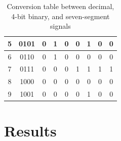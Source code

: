\documentclass[12pt]{article}
\begin{document}
\begin{table}[ht]
\begin{tabular}{ | c | c | c | c | c | c | c | c | c | }
  5                                                                      & 0101                                                                    & 0                             & 1                             & 0                             & 0                             & 1                             & 0                             & 0                             \\ \hline
  6                                                                      & 0110                                                                    & 0                             & 1                             & 0                             & 0                             & 0                             & 0                             & 0                             \\ \hline
  7                                                                      & 0111                                                                    & 0                             & 0                             & 0                             & 1                             & 1                             & 1                             & 1                             \\ \hline
  8                                                                      & 1000                                                                    & 0                             & 0                             & 0                             & 0                             & 0                             & 0                             & 0                             \\ \hline
  9                                                                      & 1001                                                                    & 0                             & 0                             & 0                             & 0                             & 1                             & 0                             & 0                             \\ \hline
  \end{tabular}
  \caption{Conversion table between decimal, 4-bit binary, and seven-segment signals}
  \label{table:1}
\end{table}

\section{Results}
\end{document}

